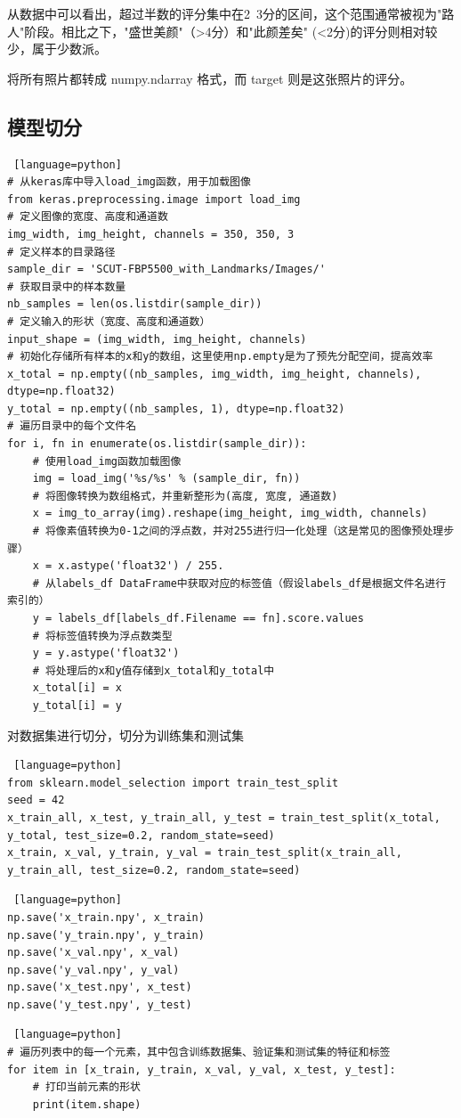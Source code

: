 \documentclass{article}
\begin{document}
从数据中可以看出，超过半数的评分集中在2~3分的区间，这个范围通常被视为"路人"阶段。相比之下，"盛世美颜"（>4分）和"此颜差矣" (<2分)的评分则相对较少，属于少数派。\par
将所有照片都转成 numpy.ndarray 格式，而 target 则是这张照片的评分。
\subsection{模型切分}
\begin{lstlisting} [language=python]
# 从keras库中导入load_img函数，用于加载图像  
from keras.preprocessing.image import load_img  
# 定义图像的宽度、高度和通道数  
img_width, img_height, channels = 350, 350, 3  
# 定义样本的目录路径  
sample_dir = 'SCUT-FBP5500_with_Landmarks/Images/'  
# 获取目录中的样本数量  
nb_samples = len(os.listdir(sample_dir))  
# 定义输入的形状（宽度、高度和通道数）  
input_shape = (img_width, img_height, channels)  
# 初始化存储所有样本的x和y的数组，这里使用np.empty是为了预先分配空间，提高效率  
x_total = np.empty((nb_samples, img_width, img_height, channels), dtype=np.float32)  
y_total = np.empty((nb_samples, 1), dtype=np.float32)  
# 遍历目录中的每个文件名  
for i, fn in enumerate(os.listdir(sample_dir)):  
    # 使用load_img函数加载图像  
    img = load_img('%s/%s' % (sample_dir, fn))  
    # 将图像转换为数组格式，并重新整形为(高度, 宽度, 通道数)  
    x = img_to_array(img).reshape(img_height, img_width, channels)  
    # 将像素值转换为0-1之间的浮点数，并对255进行归一化处理（这是常见的图像预处理步骤）  
    x = x.astype('float32') / 255.  
    # 从labels_df DataFrame中获取对应的标签值（假设labels_df是根据文件名进行索引的）  
    y = labels_df[labels_df.Filename == fn].score.values  
    # 将标签值转换为浮点数类型  
    y = y.astype('float32')  
    # 将处理后的x和y值存储到x_total和y_total中  
    x_total[i] = x  
    y_total[i] = y
\end{lstlisting}

对数据集进行切分，切分为训练集和测试集
\begin{lstlisting} [language=python]
from sklearn.model_selection import train_test_split
seed = 42
x_train_all, x_test, y_train_all, y_test = train_test_split(x_total, y_total, test_size=0.2, random_state=seed)
x_train, x_val, y_train, y_val = train_test_split(x_train_all, y_train_all, test_size=0.2, random_state=seed)
\end{lstlisting}
\begin{lstlisting} [language=python]
np.save('x_train.npy', x_train)
np.save('y_train.npy', y_train)
np.save('x_val.npy', x_val)
np.save('y_val.npy', y_val)
np.save('x_test.npy', x_test)
np.save('y_test.npy', y_test)
\end{lstlisting}
\begin{lstlisting} [language=python]
# 遍历列表中的每一个元素，其中包含训练数据集、验证集和测试集的特征和标签
for item in [x_train, y_train, x_val, y_val, x_test, y_test]:
    # 打印当前元素的形状  
    print(item.shape)
\end{lstlisting}
\end{document}
